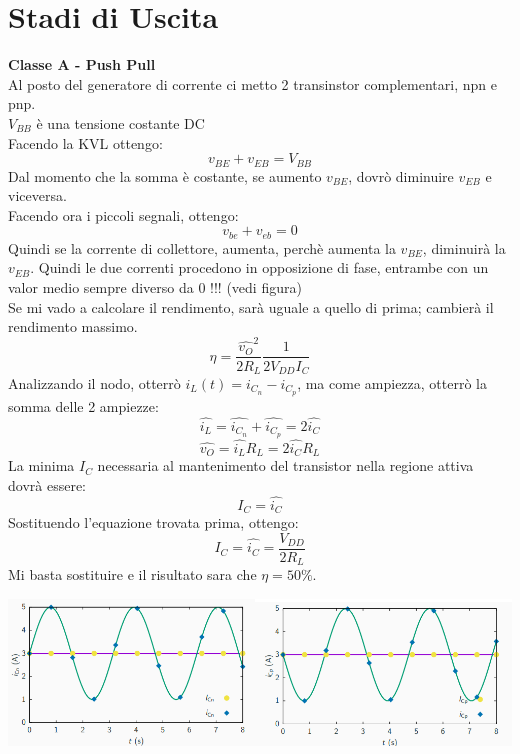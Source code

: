 \documentclass{article}
\begin{document}
\newpage
\section{Stadi di Uscita}

\textbf{Classe A - Push Pull}\\
Al posto del generatore di corrente ci metto 2 transinstor complementari, npn e pnp.\\
$V_{BB}$ è una tensione costante DC \\
Facendo la KVL ottengo:\\
\begin{equation}
    v_{BE}+v_{EB}=V_{BB}
\end{equation}
Dal momento che la somma è costante, se aumento $v_{BE}$, dovrò diminuire $v_{EB}$ e viceversa.\\
Facendo ora i piccoli segnali, ottengo: \\
\begin{equation}
    v_{be}+v_{eb}=0
\end{equation}
Quindi se la corrente di collettore, aumenta, perchè aumenta la $v_{BE}$, diminuirà la $v_{EB}$. Quindi le due correnti procedono in opposizione di fase, entrambe con un valor medio sempre diverso da 0 !!! (vedi figura)\\
Se mi vado a calcolare il rendimento, sarà uguale a quello di prima; cambierà il rendimento massimo.\\
\begin{equation}
    \eta=\frac{\hat{v_{O}}^2}{2R_{L}}\frac{1}{2V_{DD}I_{C}}
\end{equation}
Analizzando il nodo, otterrò $i_{L}(t)=i_{C_{n}}-i_{C_{p}}$, ma come ampiezza, otterrò la somma delle 2 ampiezze: 
\begin{equation}
    \hat{i_{L}}=\hat{i_{C_{n}}}+\hat{i_{C_{p}}}=2\hat{i_{C}}
\end{equation}
\begin{equation}
    \hat{v_{O}}=\hat{i_{L}}R_{L}=2\hat{i_{C}}R_{L}
\end{equation}
La minima $I_{C}$ necessaria al mantenimento del transistor nella regione attiva dovrà essere:
\begin{equation}
    I_{C}=\hat{i_{C}}
\end{equation}
Sostituendo l'equazione trovata prima, ottengo:
\begin{equation}
    I_{C}=\hat{i_{C}}=\frac{V_{DD}}{2R_{L}}
\end{equation}
Mi basta sostituire e il risultato sara che $ \eta=50\% $.
\begin{center}
    \includegraphics[scale=0.6]{Exit.png}
\end{center}
\end{document}
